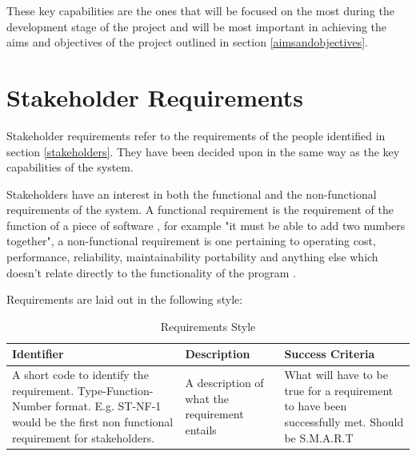 \documentclass[11pt]{book}
\begin{document}
These key capabilities are the ones that will be focused on the most during the development stage of the project and will be most important in achieving the aims and objectives of the project outlined in section \ref{aimsandobjectives}.

\section{Stakeholder Requirements}
Stakeholder requirements refer to the requirements of the people identified in section \ref{stakeholders}. They have been decided upon in the same way as the key capabilities of the system. 

Stakeholders have an interest in both the functional and the non-functional requirements of the system. A functional requirement is the requirement of the function of a piece of software \cite{functionalrequirements}, for example "it must be able to add two numbers together", a non-functional requirement is one pertaining to operating cost, performance, reliability, maintainability portability and anything else which doesn't relate directly to the functionality of the program \cite{nonfunctionalrequirements}.

Requirements are laid out in the following style:

\begin{table}[h]
\centering
\begin{tabular}{|p{5cm}|p{5cm}|p{5cm}|}
\hline
\textbf{Identifier} & \textbf{Description} & \textbf{Success Criteria} \\ \hline
A short code to identify the requirement. Type-Function-Number format. E.g. ST-NF-1 would be the first non functional requirement for stakeholders. & A description of what the requirement entails  & What will have to be true for a requirement to have been successfully met. Should be S.M.A.R.T \cite{SMART} \\ \hline
\end{tabular}
\caption{Requirements Style}
\label{tab:requirementsstyle}
\end{table}

\clearpage
\end{document}
